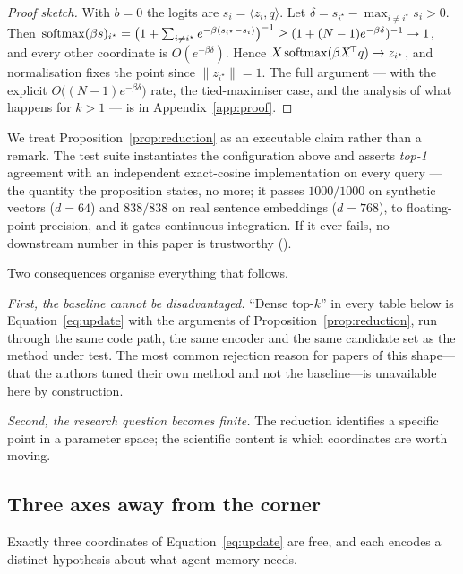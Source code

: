 \begin{proof}[Proof sketch]
With $b=0$ the logits are $s_i = \langle z_i,q\rangle$. Let $\delta = s_{i^\star} - \max_{i\neq i^\star} s_i > 0$.
Then $\operatorname{softmax}(\beta s)_{i^\star} = \big(1 + \sum_{i\neq i^\star} e^{-\beta(s_{i^\star}-s_i)}\big)^{-1}
\geq (1 + (N-1)e^{-\beta\delta})^{-1} \to 1$, and every other coordinate is
$O(e^{-\beta\delta})$. Hence $X\operatorname{softmax}(\beta X^{\!\top}q) \to z_{i^\star}$, and normalisation fixes
the point since $\|z_{i^\star}\|=1$. The full argument --- with the explicit
$O\big((N{-}1)e^{-\beta\delta}\big)$ rate, the tied-maximiser case, and the analysis of
what happens for $k>1$ --- is in Appendix~\ref{app:proof}.
\end{proof}

We treat Proposition~\ref{prop:reduction} as an executable claim rather than a remark. The
test suite instantiates the configuration above and asserts \emph{top-1} agreement with an
independent exact-cosine implementation on every query --- the quantity the proposition
states, no more; it passes $1000/1000$ on synthetic vectors
($d{=}64$) and $838/838$ on real sentence embeddings ($d{=}768$), to floating-point
precision, and it gates continuous integration. If it ever fails, no downstream number in this paper is trustworthy
().

Two consequences organise everything that follows.

\emph{First, the baseline cannot be disadvantaged.} ``Dense top-$k$'' in every table below
is Equation~\eqref{eq:update} with the arguments of Proposition~\ref{prop:reduction}, run
through the same code path, the same encoder and the same candidate set as the method under
test. The most common rejection reason for papers of this shape---that the authors tuned
their own method and not the baseline---is unavailable here by construction.

\emph{Second, the research question becomes finite.} The reduction identifies a specific
point in a parameter space; the scientific content is which coordinates are worth moving.

\subsection{Three axes away from the corner}
\label{sec:axes}

Exactly three coordinates of Equation~\eqref{eq:update} are free, and each encodes a
distinct hypothesis about what agent memory needs.

